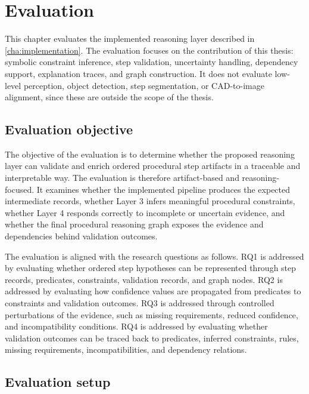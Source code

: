 \chapter{Evaluation}
\label{cha:evaluation}

This chapter evaluates the implemented reasoning layer described in \cref{cha:implementation}. The evaluation focuses on the contribution of this thesis: symbolic constraint inference, step validation, uncertainty handling, dependency support, explanation traces, and graph construction. It does not evaluate low-level perception, object detection, step segmentation, or CAD-to-image alignment, since these are outside the scope of the thesis.

\section{Evaluation objective}
\label{sec:evaluation-objective}

The objective of the evaluation is to determine whether the proposed reasoning layer can validate and enrich ordered procedural step artifacts in a traceable and interpretable way. The evaluation is therefore artifact-based and reasoning-focused. It examines whether the implemented pipeline produces the expected intermediate records, whether Layer 3 infers meaningful procedural constraints, whether Layer 4 responds correctly to incomplete or uncertain evidence, and whether the final procedural reasoning graph exposes the evidence and dependencies behind validation outcomes.

The evaluation is aligned with the research questions as follows. RQ1 is addressed by evaluating whether ordered step hypotheses can be represented through step records, predicates, constraints, validation records, and graph nodes. RQ2 is addressed by evaluating how confidence values are propagated from predicates to constraints and validation outcomes. RQ3 is addressed through controlled perturbations of the evidence, such as missing requirements, reduced confidence, and incompatibility conditions. RQ4 is addressed by evaluating whether validation outcomes can be traced back to predicates, inferred constraints, rules, missing requirements, incompatibilities, and dependency relations.

\section{Evaluation setup}
\label{sec:evaluation-setup}

